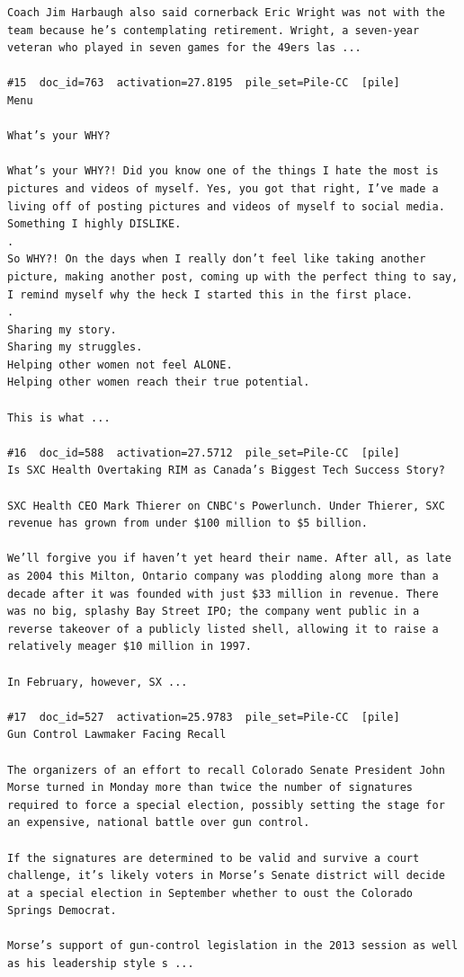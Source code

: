 \begin{verbatim}
Coach Jim Harbaugh also said cornerback Eric Wright was not with the team because he’s contemplating retirement. Wright, a seven-year veteran who played in seven games for the 49ers las ...

#15  doc_id=763  activation=27.8195  pile_set=Pile-CC  [pile]
Menu

What’s your WHY?

What’s your WHY?! Did you know one of the things I hate the most is pictures and videos of myself. Yes, you got that right, I’ve made a living off of posting pictures and videos of myself to social media. Something I highly DISLIKE.
.
So WHY?! On the days when I really don’t feel like taking another picture, making another post, coming up with the perfect thing to say, I remind myself why the heck I started this in the first place.
.
Sharing my story.
Sharing my struggles.
Helping other women not feel ALONE.
Helping other women reach their true potential.

This is what ...

#16  doc_id=588  activation=27.5712  pile_set=Pile-CC  [pile]
Is SXC Health Overtaking RIM as Canada’s Biggest Tech Success Story?

SXC Health CEO Mark Thierer on CNBC's Powerlunch. Under Thierer, SXC revenue has grown from under $100 million to $5 billion.

We’ll forgive you if haven’t yet heard their name. After all, as late as 2004 this Milton, Ontario company was plodding along more than a decade after it was founded with just $33 million in revenue. There was no big, splashy Bay Street IPO; the company went public in a reverse takeover of a publicly listed shell, allowing it to raise a relatively meager $10 million in 1997.

In February, however, SX ...

#17  doc_id=527  activation=25.9783  pile_set=Pile-CC  [pile]
Gun Control Lawmaker Facing Recall

The organizers of an effort to recall Colorado Senate President John Morse turned in Monday more than twice the number of signatures required to force a special election, possibly setting the stage for an expensive, national battle over gun control.

If the signatures are determined to be valid and survive a court challenge, it’s likely voters in Morse’s Senate district will decide at a special election in September whether to oust the Colorado Springs Democrat.

Morse’s support of gun-control legislation in the 2013 session as well as his leadership style s ...


\end{verbatim}
